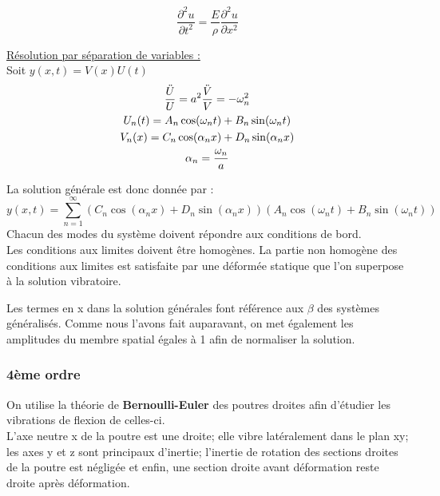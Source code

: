\documentclass[../main.tex]{subfiles}
\begin{document}
\begin{equation}
    \frac{\partial^2u}{\partial t^2} = \frac{E}{\rho} \frac{\partial^2u}{\partial x^2}
\end{equation}

\quad \underline{Résolution par séparation de variables :}\\

Soit $y(x,t) = V(x)U(t)$\\
\begin{equation}\begin{gathered}
    \frac{\Ddot{U}}{U} = a^2 \frac{\Ddot{V}}{V} = -\omega_n^2\\
    U_n(t) = A_n \cos(\omega_n t) + B_n \sin(\omega_n t)\\
    V_n(x) = C_n \cos(\alpha_n x) + D_n \sin(\alpha_n x)\\
    \alpha_n = \frac{\omega_n}{a}\\
    \end{gathered}
\end{equation}

La solution générale est donc donnée par : \begin{equation}
    y(x,t) = \sum_{n=1}^\infty (C_n \cos(\alpha_n x) + D_n \sin(\alpha_n x))(A_n \cos(\omega_n t) + B_n \sin(\omega_n t))
\end{equation}
Chacun des modes du système doivent répondre aux conditions de bord.\\
Les conditions aux limites doivent être homogènes. La partie non homogène des conditions aux limites est satisfaite par une déformée statique que l'on superpose à la solution vibratoire.

\warning Les termes en x dans la solution générales font référence aux $\beta$ des systèmes généralisés. Comme nous l'avons fait auparavant, on met également les amplitudes du membre spatial égales à 1 afin de normaliser la solution.\\

\subsubsection{4ème ordre}
On utilise la théorie de \textbf{Bernoulli-Euler} des poutres droites afin d'étudier les vibrations de flexion de celles-ci.\\
L'axe neutre x de la poutre est une droite; elle vibre latéralement dans le plan xy; les axes y et z sont principaux d'inertie; l'inertie de rotation des sections droites de la poutre est négligée et enfin, une section droite avant déformation reste droite après déformation.\\
\end{document}
